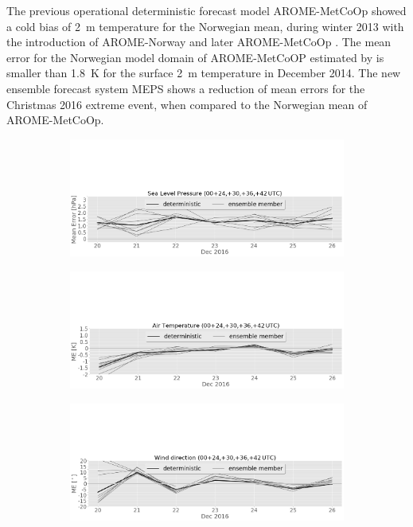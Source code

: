 The previous operational deterministic forecast model AROME-MetCoOp showed a cold bias of \SI{2}{\metre} temperature for the Norwegian mean, during winter 2013 with the introduction of AROME-Norway and later AROME-MetCoOp \citep{muller_arome-metcoop:_2017}. 
The mean error for the Norwegian model domain of AROME-MetCoOP estimated by \citet{muller_arome-metcoop:_2017} is smaller than \SI{1.8}{\kelvin} for the surface \SI{2}{\metre} temperature in December 2014. 
The new ensemble forecast system MEPS shows a reduction of mean errors for the Christmas 2016 extreme event, when compared to the Norwegian mean of AROME-MetCoOp.
\begin{figure}[H]%
		\centering
		\begin{subfigure}[b]{0.8\textwidth}
			\includegraphics[trim={0cm 0cm 0cm 9.5cm},clip,width=\textwidth]{./fig_sfc_pressure/ME_20161220_26_00}
			\caption{}\label{fig:bias:pres}
		\end{subfigure}
		\begin{subfigure}[b]{0.8\textwidth}
			\includegraphics[trim={0cm 0cm 0cm 9.5cm},clip,width=\textwidth]{./fig_sfc_temp/ME_20161220_26_00}
			\caption{}\label{fig:bias:temp}
		\end{subfigure}
		\begin{subfigure}[b]{0.8\textwidth}
			\includegraphics[trim={0cm 0cm 0cm 9.5cm},clip,width=\textwidth]{./fig_sfc_wd/ME_20161220_26_00}

\end{subfigure}
\end{figure}
